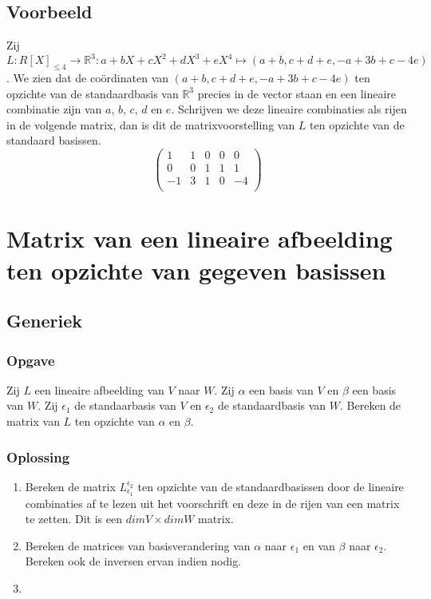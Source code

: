 \documentclass[lineaire_algebra_oplossingen.tex]{subfiles}
\begin{document}
\subsection*{Voorbeeld}
Zij $L:R[X]_{\le 4}\rightarrow \mathbb{R}^3: a+bX+cX^2+dX^3+eX^4\mapsto (a+b,c+d+e,-a+3b+c-4e)$.
We zien dat de co\"ordinaten van $(a+b,c+d+e,-a+3b+c-4e)$ ten opzichte van de standaardbasis van $\mathbb{R}^3$ precies in de vector staan en een lineaire combinatie zijn van $a$, $b$, $c$, $d$ en $e$.
Schrijven we deze lineaire combinaties als rijen in de volgende matrix, dan is dit de matrixvoorstelling van $L$ ten opzichte van de standaard basissen.
\[
\begin{pmatrix}
1 & 1 & 0 & 0 & 0\\
0 & 0 & 1 & 1 & 1\\
-1 & 3 & 1 & 0 & -4\\
\end{pmatrix}
\]


\section{Matrix van een lineaire afbeelding ten opzichte van gegeven basissen}
\label{matrix_van_lineaire_afbeeldingen_tov_gegeven_basissen}

\subsection*{Generiek}
\subsubsection*{Opgave}
Zij $L$ een lineaire afbeelding van $V$ naar $W$.
Zij $\alpha$ een basis van $V$ en $\beta$ een basis van $W$.
Zij $\epsilon_1$ de standaarbasis van $V$ en $\epsilon_2$ de standaardbasis van $W$.
Bereken de matrix van $L$ ten opzichte van $\alpha$ en $\beta$.
\subsubsection*{Oplossing}
\begin{enumerate}
\item
Bereken de matrix $L_{\epsilon_1}^{\epsilon_2}$ ten opzichte van de standaardbasissen door de lineaire combinaties af te lezen uit het voorschrift en deze in de rijen van een matrix te zetten.
Dit is een $dimV \times dimW$ matrix.

\item
Bereken de matrices van basisverandering van $\alpha$ naar $\epsilon_1$ en van $\beta$ naar $\epsilon_2$. Bereken ook de inversen ervan indien nodig.

\item
\end{enumerate}
\end{document}
